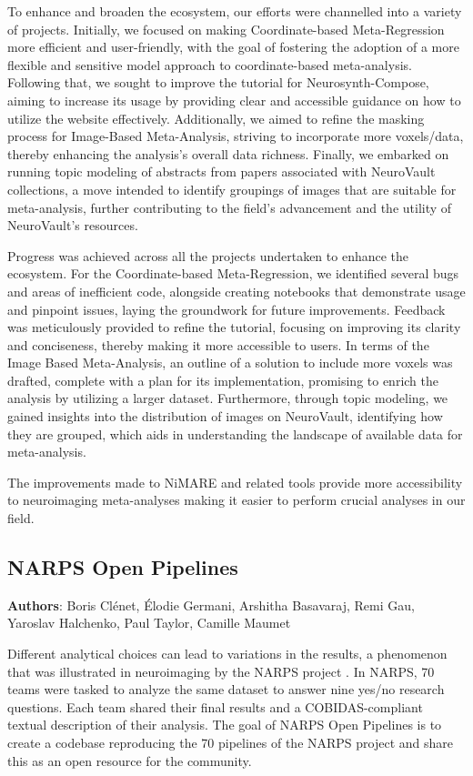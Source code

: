 \documentclass{article}
\begin{document}
To enhance and broaden the ecosystem, our efforts were channelled into a variety of projects. Initially, we focused on making Coordinate-based Meta-Regression more efficient and user-friendly, with the goal of fostering the adoption of a more flexible and sensitive model approach to coordinate-based meta-analysis. Following that, we sought to improve the tutorial for Neurosynth-Compose, aiming to increase its usage by providing clear and accessible guidance on how to utilize the website effectively. Additionally, we aimed to refine the masking process for Image-Based Meta-Analysis, striving to incorporate more voxels/data, thereby enhancing the analysis's overall data richness. Finally, we embarked on running topic modeling of abstracts from papers associated with NeuroVault collections, a move intended to identify groupings of images that are suitable for meta-analysis, further contributing to the field's advancement and the utility of NeuroVault's resources.

Progress was achieved across all the projects undertaken to enhance the ecosystem. For the Coordinate-based Meta-Regression, we identified several bugs and areas of inefficient code, alongside creating notebooks that demonstrate usage and pinpoint issues, laying the groundwork for future improvements. Feedback was meticulously provided to refine the tutorial, focusing on improving its clarity and conciseness, thereby making it more accessible to users. In terms of the Image Based Meta-Analysis, an outline of a solution to include more voxels was drafted, complete with a plan for its implementation, promising to enrich the analysis by utilizing a larger dataset. Furthermore, through topic modeling, we gained insights into the distribution of images on NeuroVault, identifying how they are grouped, which aids in understanding the landscape of available data for meta-analysis.

The improvements made to NiMARE and related tools provide more accessibility to neuroimaging meta-analyses making it easier to perform crucial analyses in our field.




\subsection{NARPS Open Pipelines}
\textbf{Authors}: Boris Clénet, Élodie Germani, Arshitha Basavaraj, Remi Gau, Yaroslav Halchenko, Paul Taylor, Camille Maumet

Different analytical choices can lead to variations in the results, a phenomenon that was illustrated in neuroimaging by the NARPS project \cite{botvinik2020}. In NARPS, 70 teams were tasked to analyze the same dataset to answer nine yes/no research questions. Each team shared their final results and a COBIDAS-compliant \cite{nichols2017} textual description of their analysis. The goal of NARPS Open Pipelines is to create a codebase reproducing the 70 pipelines of the NARPS project and share this as an open resource for the community.
\end{document}
